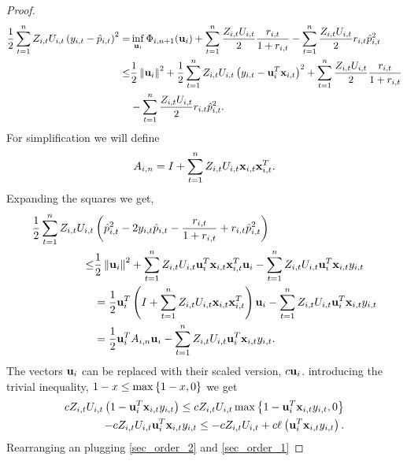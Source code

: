\begin{proof}
\begin{equation*}
\begin{split}
\frac{1}{2} \sum_{t=1}^{n}Z_{i,t}U_{i,t}\left({y_{i,t}-\hat{p}_{i,t}}\right)^{2}=& \inf_{\mathbf{u}_i}{\Phi_{i,n+1}}(\mathbf{u}_i)+ \sum_{t=1}^{n}\frac{Z_{i,t}U_{i,t}}{2}\frac{r_{i,t}}{1+r_{i,t}}-\sum_{t=1}^{n}\frac{Z_{i,t}U_{i,t}}{2}r_{i,t}\hat{p}_{i,t}^2\\
\le&\frac{1}{2}\left\Vert {\mathbf{u}_i} \right\Vert^2+\frac{1}{2}\sum_{t=1}^{n}{Z_{i,t}U_{i,t}\left({y_{i,t}-\mathbf{u}_i^T\mathbf{x}_{i,t}}\right)}^2+ \sum_{t=1}^{n}\frac{Z_{i,t}U_{i,t}}{2}\frac{r_{i,t}}{1+r_{i,t}}\\&-\sum_{t=1}^{n}\frac{Z_{i,t}U_{i,t}}{2}r_{i,t}\hat{p}_{i,t}^2.
\end{split}
\end{equation*} 
For simplification we will define
\begin{equation*}
A_{i,n}=I+\sum_{t=1}^{n}{Z_{i,t}U_{i,t}}\mathbf{x}_{i,t}\mathbf{x}_{i,t}^T.
\end{equation*}
Expanding the squares we get,
\begin{equation}
\begin{split}
\frac{1}{2} \sum_{t=1}^{n}Z_{i,t}U_{i,t}&\left({\hat{p}_{i,t}^2-2y_{i,t}\hat{p}_{i,t}-\frac{r_{i,t}}{1+r_{i,t}}+r_{i,t}\hat{p}_{i,t}^2}\right)\\
\le& \frac{1}{2}\left\Vert {\mathbf{u}_i} \right\Vert^2+\sum_{t=1}^{n}{Z_{i,t}U_{i,t}\mathbf{u}_i^T\mathbf{x}_{i,t}\mathbf{x}_{i,t}^T\mathbf{u}_i}-\sum_{t=1}^{n}{Z_{i,t}U_{i,t}\mathbf{u}_i^T\mathbf{x}_{i,t}y_{i,t}}\\
&=\frac{1}{2} \mathbf{u}_i^T\left({I+\sum_{t=1}^{n}{Z_{i,t}U_{i,t}}\mathbf{x}_{i,t}\mathbf{x}_{i,t}^T}\right)\mathbf{u}_i-\sum_{t=1}^{n}{Z_{i,t}U_{i,t}\mathbf{u}_i^T\mathbf{x}_{i,t}y_{i,t}}\\
&=\frac{1}{2} \mathbf{u}_i^T A_{i,n} \mathbf{u}_i-\sum_{t=1}^{n}{Z_{i,t}U_{i,t}\mathbf{u}_i^T\mathbf{x}_{i,t}y_{i,t}}.
\end{split}
\label{sec_order_1}
\end{equation} 
The vectors $\mathbf{u}_i$ can be replaced with their scaled version, $c\mathbf{u}_i$. introducing the trivial inequality, $1-x\le \max\left\{{1-x,0}\right\}$ we get 
\begin{equation}
\begin{split}
cZ_{i,t}U_{i,t}\left({1-\mathbf{u}_i^T\mathbf{x}_{i,t}y_{i,t}}\right) \le cZ_{i,t}U_{i,t}\max\left\{{1-\mathbf{u}_i^T\mathbf{x}_{i,t}y_{i,t},0}\right\}\\
-cZ_{i,t}U_{i,t}\mathbf{u}_i^T\mathbf{x}_{i,t}y_{i,t}\le-cZ_{i,t}U_{i,t}+c \ell_{}\left({\mathbf{u}_i^T\mathbf{x}_{i,t}y_{i,t}}\right).
\label{sec_order_2}
\end{split}
\end{equation}
Rearranging an plugging \eqref{sec_order_2} and \eqref{sec_order_1} 


\end{proof}
